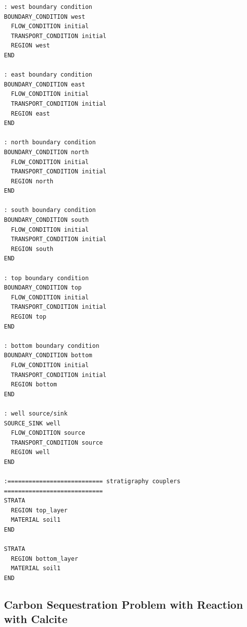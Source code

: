 \documentclass[12pt]{article}
\begin{document}
\begin{mdframed}
\begin{verbatim}
: west boundary condition
BOUNDARY_CONDITION west
  FLOW_CONDITION initial
  TRANSPORT_CONDITION initial
  REGION west
END

: east boundary condition
BOUNDARY_CONDITION east
  FLOW_CONDITION initial
  TRANSPORT_CONDITION initial
  REGION east
END

: north boundary condition
BOUNDARY_CONDITION north
  FLOW_CONDITION initial
  TRANSPORT_CONDITION initial
  REGION north
END

: south boundary condition
BOUNDARY_CONDITION south
  FLOW_CONDITION initial
  TRANSPORT_CONDITION initial
  REGION south
END

: top boundary condition
BOUNDARY_CONDITION top
  FLOW_CONDITION initial
  TRANSPORT_CONDITION initial
  REGION top
END

: bottom boundary condition
BOUNDARY_CONDITION bottom
  FLOW_CONDITION initial
  TRANSPORT_CONDITION initial
  REGION bottom
END

: well source/sink
SOURCE_SINK well
  FLOW_CONDITION source
  TRANSPORT_CONDITION source
  REGION well
END

:=========================== stratigraphy couplers ============================
STRATA
  REGION top_layer
  MATERIAL soil1
END

STRATA
  REGION bottom_layer
  MATERIAL soil1
END

\end{verbatim}

\end{mdframed}

\normalsize

\subsection{Carbon Sequestration Problem with Reaction with Calcite}
\end{document}
